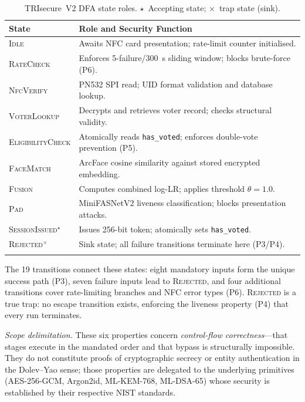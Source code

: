 \documentclass[pdflatex,sn-mathphys-num]{sn-jnl}%
\theoremstyle{thmstyleone}%
\theoremstyle{thmstyletwo}%
\theoremstyle{thmstylethree}%
\begin{document}
\begin{table}[t]
\caption{TRIsecure~V2 DFA state roles.
  $\star$~Accepting state; $\times$~trap state (sink).}
\label{tab:dfa_states}%
\begin{tabular}{@{}lp{5.2cm}@{}}
  \toprule
  State & Role and Security Function \\
  \midrule
  \textsc{Idle}
    & Awaits NFC card presentation; rate-limit counter initialised. \\
  \textsc{RateCheck}
    & Enforces 5-failure/300~s sliding window; blocks brute-force (P6). \\
  \textsc{NfcVerify}
    & PN532 SPI read; UID format validation and database lookup. \\
  \textsc{VoterLookup}
    & Decrypts and retrieves voter record; checks structural validity. \\
  \textsc{EligibilityCheck}
    & Atomically reads \texttt{has\_voted}; enforces double-vote prevention (P5). \\
  \textsc{FaceMatch}
    & ArcFace cosine similarity against stored encrypted embedding. \\
  \textsc{Fusion}
    & Computes combined log-LR; applies threshold \(\theta{=}1.0\). \\
  \textsc{Pad}
    & MiniFASNetV2 liveness classification; blocks presentation attacks. \\
  \textsc{SessionIssued}$^\star$
    & Issues 256-bit token; atomically sets \texttt{has\_voted}. \\
  \textsc{Rejected}$^\times$
    & Sink state; all failure transitions terminate here (P3/P4). \\
  \botrule
\end{tabular}
\end{table}

The 19 transitions connect these states: eight mandatory inputs form the unique
success path (P3), seven failure inputs lead to \textsc{Rejected}, and four
additional transitions cover rate-limiting branches and NFC error types (P6).
\textsc{Rejected} is a true trap: no escape transition exists, enforcing the
liveness property (P4) that every run terminates.

\textit{Scope delimitation.} These six properties concern
\emph{control-flow correctness}---that stages execute in the mandated order and
that bypass is structurally impossible. They do not constitute proofs of
cryptographic secrecy or entity authentication in the Dolev--Yao sense; those
properties are delegated to the underlying primitives (AES-256-GCM, Argon2id,
ML-KEM-768, ML-DSA-65) whose security is established by their respective NIST
standards.
\end{document}

